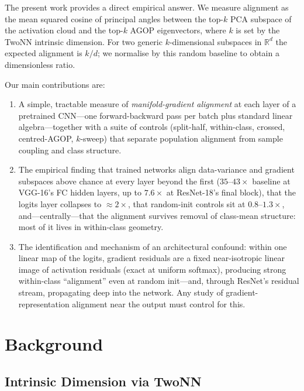 \documentclass{article}
\newcommand{\R}{\mathbb{R}}
\begin{document}
The present work provides a direct empirical answer.  We measure alignment as
the mean squared cosine of principal angles between the top-$k$ PCA subspace
of the activation cloud and the top-$k$ AGOP eigenvectors, where $k$ is set
by the TwoNN intrinsic dimension.  For two generic $k$-dimensional subspaces
in $\R^d$ the expected alignment is $k/d$; we normalise by this random
baseline to obtain a dimensionless ratio.

Our main contributions are:
\begin{enumerate}
\item A simple, tractable measure of \emph{manifold-gradient alignment} at
  each layer of a pretrained CNN---one forward-backward pass per batch plus
  standard linear algebra---together with a suite of controls (split-half,
  within-class, crossed, centred-AGOP, $k$-sweep) that separate population
  alignment from sample coupling and class structure.

\item The empirical finding that trained networks align data-variance and
  gradient subspaces above chance at every layer beyond the first
  ($35$--$43\times$ baseline at VGG-16's FC hidden layers, up to
  $7.6\times$ at ResNet-18's final block), that the logits layer collapses
  to ${\approx}2\times$, that random-init controls sit at
  $0.8$--$1.3\times$, and---centrally---that the alignment survives removal
  of class-mean structure: most of it lives in within-class geometry.

\item The identification and mechanism of an architectural confound: within
  one linear map of the logits, gradient residuals are a fixed
  near-isotropic linear image of activation residuals (exact at uniform
  softmax), producing strong within-class ``alignment'' even at random
  init---and, through ResNet's residual stream, propagating deep into the
  network.  Any study of gradient-representation alignment near the output
  must control for this.
\end{enumerate}

\section{Background}
\label{sec:background}

\subsection{Intrinsic Dimension via TwoNN}
\label{sec:twonn}
\end{document}
